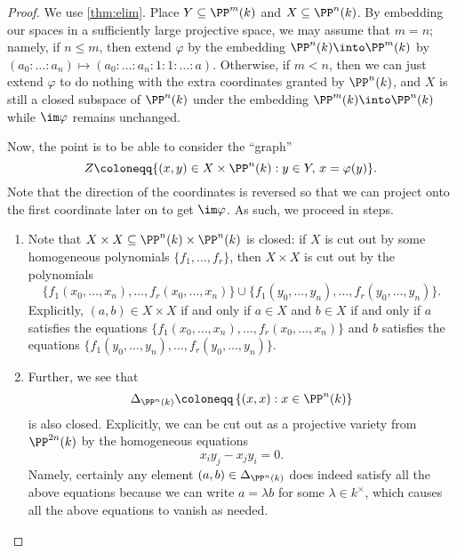 \documentclass[../notes.tex]{subfiles}
\begin{document}
\begin{proof}
	We use \autoref{thm:elim}. Place $Y\subseteq\PP^m(k)$ and $X\subseteq\PP^n(k)$. By embedding our spaces in a sufficiently large projective space, we may assume that $m=n$; namely, if $n\le m$, then extend $\varphi$ by the embedding $\PP^n(k)\into\PP^m(k)$ by $(a_0:\ldots:a_n)\mapsto(a_0:\ldots:a_n:1:1:\ldots:a)$. Otherwise, if $m<n$, then we can just extend $\varphi$ to do nothing with the extra coordinates granted by $\PP^n(k)$, and $X$ is still a closed subspace of $\PP^n(k)$ under the embedding $\PP^m(k)\into\PP^n(k)$ while $\im\varphi$ remains unchanged.
	
	Now, the point is to be able to consider the ``graph''
	\[Z\coloneqq\{(x,y)\in X\times\PP^n(k):y\in Y,\,x=\varphi(y)\}.\]
	Note that the direction of the coordinates is reversed so that we can project onto the first coordinate later on to get $\im\varphi$. As such, we proceed in steps.
	\begin{enumerate}
		\item Note that $X\times X\subseteq\PP^n(k)\times\PP^n(k)$ is closed: if $X$ is cut out by some homogeneous polynomials $\{f_1,\ldots,f_r\}$, then $X\times X$ is cut out by the polynomials
		\[\{f_1(x_0,\ldots,x_n),\ldots,f_r(x_0,\ldots,x_n)\}\cup\{f_1(y_0,\ldots,y_n),\ldots,f_r(y_0,\ldots,y_n)\}.\]
		Explicitly, $(a,b)\in X\times X$ if and only if $a\in X$ and $b\in X$ if and only if $a$ satisfies the equations $\{f_1(x_0,\ldots,x_n),\ldots,f_r(x_0,\ldots,x_n)\}$ and $b$ satisfies the equations $\{f_1(y_0,\ldots,y_n),\ldots,f_r(y_0,\ldots,y_n)\}$.
		\item Further, we see that
		\[\Delta_{\PP^n(k)}\coloneqq\left\{(x,x):x\in\PP^n(k)\right\}\]
		is also closed. Explicitly, we can be cut out as a projective variety from $\PP^{2n}(k)$ by the homogeneous equations
		\[x_iy_j-x_jy_i=0.\]
		Namely, certainly any element $(a,b)\in\Delta_{\PP^n(k)}$ does indeed satisfy all the above equations because we can write $a=\lambda b$ for some $\lambda\in k^\times$, which causes all the above equations to vanish as needed.


\end{enumerate}
\end{proof}
\end{document}
